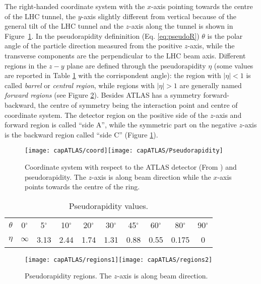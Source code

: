 The right-handed coordinate system with the $x$-axis pointing towards the centre of the LHC tunnel, the $y$-axis slightly different from vertical because of the general tilt of the LHC tunnel and the $z$-axis along the tunnel is shown in  Figure~\ref{coord}. In the pseudorapidity defininition (Eq. \ref{eq:pseudoR}) $\theta$ is the polar angle of the particle direction measured from the positive $z$-axis, while the transverse components are the perpendicular to the LHC beam axis. Different regions in the $z-y$ plane are defined through the pseudorapidity $\eta$ (some values are reported in Table \ref{tab:etatheta} with the corrispondent angle): the region with $|\eta|< 1$ is called \textit{barrel} or \textit{central region}, while regions with $|\eta|> 1$ are generally named \textit{forward regions} (see Figure \ref{regions}). Besides ATLAS has a symmetry forward-backward, the centre of symmetry being the interaction point and centre of coordinate system. The detector region on the positive side of the $z$-axis and forward region is called ``side A'', while the symmetric part on the negative $z$-axis is the backward region called ``side C'' (Figure \ref{coord}).

\begin{figure}[htb]\begin{center}
\texttt{[image: capATLAS/coord]}\texttt{[image: capATLAS/Pseudorapidity]}
\caption{Coordinate system with respect to the ATLAS detector (From \cite{hep}) and pseudorapidity. The $z$-axis is along beam direction while the $x$-axis points towards the centre of the ring.}
\label{coord}\end{center}\end{figure}

\begin{table}[htb]\centering\begin{tabular}{cccccccccc}\hline
$\theta$ & 0$^{\circ}$ & 5$^{\circ}$ & 10$^{\circ}$ & 20$^{\circ}$ & 30$^{\circ}$ & 45$^{\circ}$ & 60$^{\circ}$ & 80$^{\circ}$ & 90$^{\circ}$ \\
$\eta$ & $\infty$ & 3.13 & 2.44 & 1.74 & 1.31 & 0.88 & 0.55 & 0.175 & 0\\\hline\hline \end{tabular}\caption{Pseudorapidity values.}\label{tab:etatheta}\end{table}

\begin{figure}[htb]\begin{center}
\texttt{[image: capATLAS/regions1]}\hspace{.5cm}\texttt{[image: capATLAS/regions2]}\caption{Pseudorapidity regions. The $z$-axis is along beam direction.}\label{regions}
\end{center}\end{figure}

